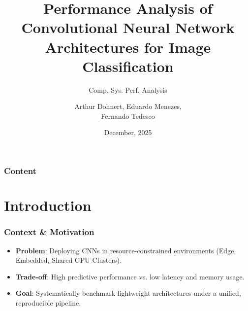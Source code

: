 \documentclass{beamer}
\title[Performance Analysis of CNNs]
      {Performance Analysis of Convolutional Neural Network Architectures for Image Classification}
\subtitle{Comp. Sys. Perf. Analysis}
\date{December, 2025}
\author{Arthur Dohnert, Eduardo Menezes, \\ Fernando Tedesco}
\institute{Instituto de Informática --- UFRGS}
\begin{document}
\InfTitlePage

\begin{frame}
  \frametitle{Content}
  \tableofcontents
\end{frame}

\section{Introduction}

\begin{frame}
    \frametitle{Context \& Motivation}
    \begin{itemize}
        \item \textbf{Problem}: Deploying CNNs in resource-constrained environments (Edge, Embedded, Shared GPU Clusters).
        \item \textbf{Trade-off}: High predictive performance vs. low latency and memory usage.
        \item \textbf{Goal}: Systematically benchmark lightweight architectures under a unified, reproducible pipeline.
    \end{itemize}
\end{frame}
\end{document}

